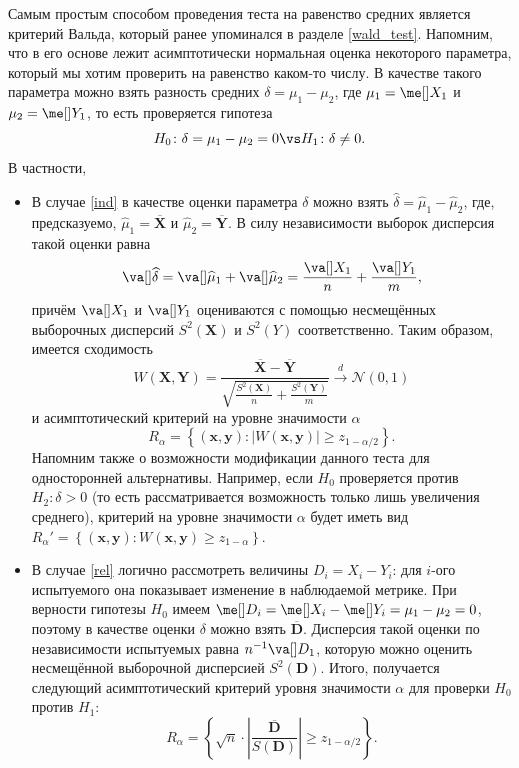 Самым простым способом проведения теста на равенство средних является критерий Вальда, который ранее упоминался в разделе \ref{wald_test}. Напомним, что в его основе лежит асимптотически нормальная оценка некоторого параметра, который мы хотим проверить на равенство каком-то числу. В качестве такого параметра можно взять разность средних $\delta = \mu_1 - \mu_2$, где $\mu_1 = \me[]X_1$ и $\mu_2 = \me[]Y_1$, то есть проверяется гипотеза
\[
H_0\colon \delta = \mu_1 - \mu_2 = 0 \vs H_1\colon \delta \ne 0.
\]
В частности,
\begin{itemize}
    \item В случае \ref{ind} в качестве оценки параметра $\delta$ можно взять $\widehat{\delta} = \widehat{\mu}_1 - \widehat{\mu}_2$, где, предсказуемо, $\widehat{\mu}_1 = \overline{\mathbf X}$ и $\widehat{\mu}_2 = \overline{\mathbf Y}$. В силу независимости выборок дисперсия такой оценки равна 
    \[
    \va[]\widehat{\delta} = \va[]\widehat{\mu}_1 + \va[]\widehat{\mu}_2 = \frac{\va[]X_1}{n} + \frac{\va[]Y_1}{m},
    \]
    причём $\va[]X_1$ и $\va[]Y_1$ оцениваются с помощью несмещённых выборочных дисперсий $S^2(\mathbf X)$ и $S^2(Y)$ соответственно. Таким образом, имеется сходимость
    \[
    W(\mathbf X, \mathbf Y) = \frac{\overline{\mathbf X} - \overline{\mathbf Y}}{\sqrt{\frac{S^2(\mathbf X)}{n} + \frac{S^2(\mathbf Y)}{m}}} \stackrel{d}{\longrightarrow} \mathcal{N}(0, 1)
    \]
    и асимптотический критерий на уровне значимости $\alpha$
    \[
    R_{\alpha} = \left\{(\mathbf{x}, \mathbf{y})\colon \left|W(\mathbf{x}, \mathbf{y})\right| \ge z_{1-\alpha/2} \right\}.
    \]
    Напомним также о возможности модификации данного теста для односторонней альтернативы. Например, если $H_0$ проверяется против $H_2\colon \delta > 0$ (то есть рассматривается возможность только лишь увеличения среднего), критерий на уровне значимости $\alpha$ будет иметь вид $R_{\alpha}' = \left\{(\mathbf{x}, \mathbf{y})\colon W(\mathbf{x}, \mathbf{y}) \ge z_{1-\alpha}\right\}$.
    \item В случае \ref{rel} логично рассмотреть величины $D_i = X_i - Y_i$: для $i$-ого испытуемого она показывает изменение в наблюдаемой метрике. При верности гипотезы $H_0$ имеем $\me[]D_i = \me[]X_i - \me[]Y_i = \mu_1 - \mu_2 = 0$, поэтому в качестве оценки $\delta$ можно взять $\overline{\mathbf D}$. Дисперсия такой оценки по независимости испытуемых равна $n^{-1}\va[]D_1$, которую можно оценить несмещённой выборочной дисперсией $S^2(\mathbf D)$. Итого, получается следующий асимптотический критерий уровня значимости $\alpha$ для проверки $H_0$ против $H_1$:
    \[
    R_{\alpha} = \left\{\sqrt{n}\cdot\left|\frac{\overline{\mathbf D}}{S(\mathbf D)}\right| \ge z_{1-\alpha/2}\right\}.
    \]
\end{itemize}

